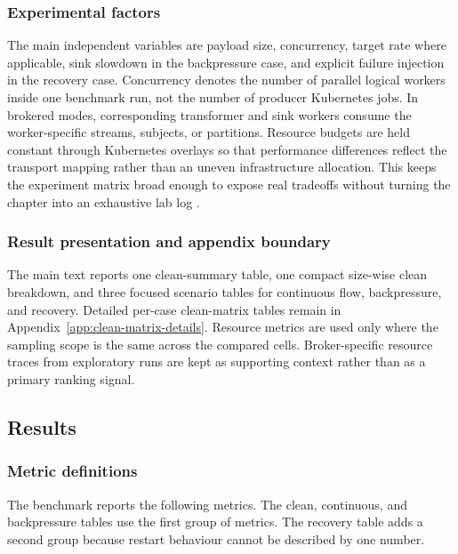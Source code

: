 \subsubsection{Experimental factors}

The main independent variables are payload size, concurrency, target rate where applicable, sink slowdown in the backpressure case, and explicit failure injection in the recovery case. Concurrency denotes the number of parallel logical workers inside one benchmark run, not the number of producer Kubernetes jobs. In brokered modes, corresponding transformer and sink workers consume the worker-specific streams, subjects, or partitions. Resource budgets are held constant through Kubernetes overlays so that performance differences reflect the transport mapping rather than an uneven infrastructure allocation. This keeps the experiment matrix broad enough to expose real tradeoffs without turning the chapter into an exhaustive lab log \cite{sharvari2019messaging,ciftci2025ipcmechanisms}.

\subsubsection{Result presentation and appendix boundary}

The main text reports one clean-summary table, one compact size-wise clean breakdown, and three focused scenario tables for continuous flow, backpressure, and recovery. Detailed per-case clean-matrix tables remain in Appendix~\ref{app:clean-matrix-details}. Resource metrics are used only where the sampling scope is the same across the compared cells. Broker-specific resource traces from exploratory runs are kept as supporting context rather than as a primary ranking signal. 

\subsection{Results}

\subsubsection{Metric definitions}

The benchmark reports the following metrics. The clean, continuous, and backpressure tables use the first group of metrics. The recovery table adds a second group because restart behaviour cannot be described by one number.

